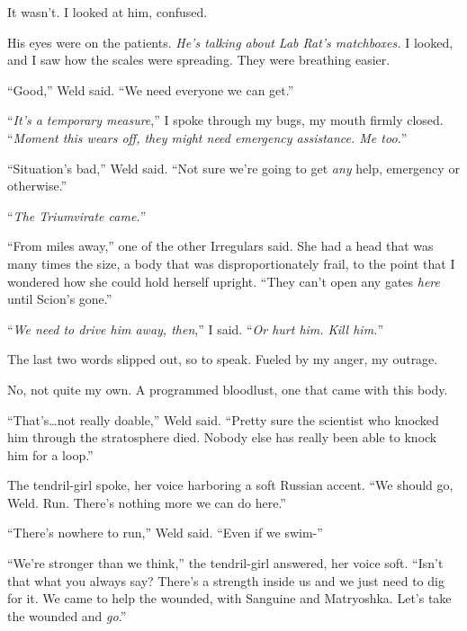 It wasn't.  I looked at him, confused.



His eyes were on the patients.  \emph{He's talking about Lab Rat's matchboxes.  }I looked, and I saw how the scales were spreading.  They were breathing easier.



``Good,'' Weld said.  ``We need everyone we can get.''



``\emph{It's a temporary measure},'' I spoke through my bugs, my mouth firmly closed.  ``\emph{Moment this wears off, they might need emergency assistance.  Me too.}''



``Situation's bad,'' Weld said.  ``Not sure we're going to get \emph{any} help, emergency or otherwise.''



``\emph{The Triumvirate came.}''



``From miles away,'' one of the other Irregulars said.  She had a head that was many times the size, a body that was disproportionately frail, to the point that I wondered how she could hold herself upright.  ``They can't open any gates \emph{here} until Scion's gone.''



``\emph{We need to drive him away, then},'' I said.  ``\emph{Or hurt him.  Kill him.}''



The last two words slipped out, so to speak.  Fueled by my anger, my outrage.



No, not quite my own.  A programmed bloodlust, one that came with this body.



``That's\ldots not really doable,'' Weld said.  ``Pretty sure the scientist who knocked him through the stratosphere died.  Nobody else has really been able to knock him for a loop.''



The tendril-girl spoke, her voice harboring a soft Russian accent.  ``We should go, Weld.  Run.  There's nothing more we can do here.''



``There's nowhere to run,'' Weld said.  ``Even if we swim-''



``We're stronger than we think,'' the tendril-girl answered, her voice soft.  ``Isn't that what you always say?  There's a strength inside us and we just need to dig for it.  We came to help the wounded, with Sanguine and Matryoshka.  Let's take the wounded and \emph{go}.''



